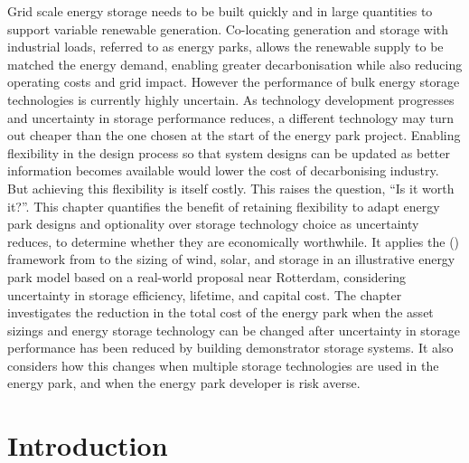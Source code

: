 \noindent
Grid scale energy storage needs to be built quickly and in large quantities to support variable renewable generation. Co-locating generation and storage with industrial loads, referred to as energy parks, allows the renewable supply to be matched the energy demand, enabling greater decarbonisation while also reducing operating costs and grid impact.
However the performance of bulk energy storage technologies is currently highly uncertain. As technology development progresses and uncertainty in storage performance reduces, a different technology may turn out cheaper than the one chosen at the start of the energy park project. Enabling flexibility in the design process so that system designs can be updated as better information becomes available would lower the cost of decarbonising industry. But achieving this flexibility is itself costly. This raises the question, ``Is it worth it?''. This chapter quantifies the benefit of retaining flexibility to adapt energy park designs and optionality over storage technology choice as uncertainty reduces, to determine whether they are economically worthwhile. It applies the  () framework from  to the sizing of wind, solar, and storage in an illustrative energy park model based on a real-world proposal near Rotterdam, considering uncertainty in storage efficiency, lifetime, and capital cost. The chapter investigates the reduction in the total cost of the energy park when the asset sizings and energy storage technology can be changed after uncertainty in storage performance has been reduced by building demonstrator storage systems. It also considers how this changes when multiple storage technologies are used in the energy park, and when the energy park developer is risk averse.\\

\newpage
\section{Introduction}

